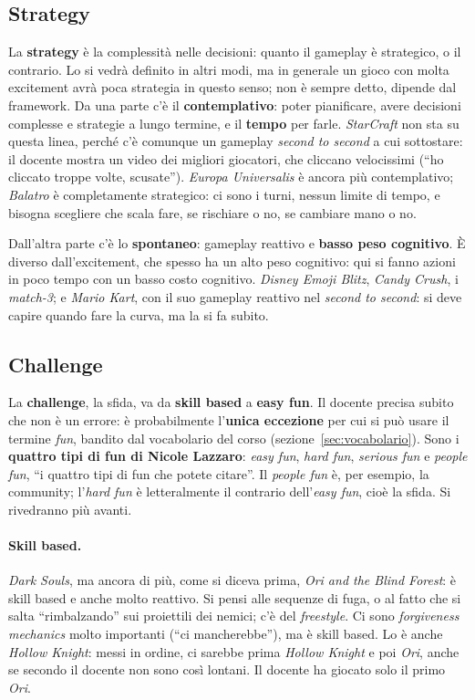 \subsection{Strategy}

La \textbf{strategy} è la complessità nelle decisioni: quanto il gameplay è
strategico, o il contrario. Lo si vedrà definito in altri modi, ma in
generale un gioco con molta excitement avrà poca strategia in questo senso;
non è sempre detto, dipende dal framework. Da una parte c'è il
\textbf{contemplativo}: poter pianificare, avere decisioni complesse e
strategie a lungo termine, e il \textbf{tempo} per farle. \emph{StarCraft}
non sta su questa linea, perché c'è comunque un gameplay \emph{second to
second} a cui sottostare: il docente mostra un video dei migliori giocatori,
che cliccano velocissimi (``ho cliccato troppe volte, scusate'').
\emph{Europa Universalis} è ancora più contemplativo; \emph{Balatro} è
completamente strategico: ci sono i turni, nessun limite di tempo, e bisogna
scegliere che scala fare, se rischiare o no, se cambiare mano o no.

Dall'altra parte c'è lo \textbf{spontaneo}: gameplay reattivo e \textbf{basso
peso cognitivo}. È diverso dall'excitement, che spesso ha un alto peso
cognitivo: qui si fanno azioni in poco tempo con un basso costo cognitivo.
\emph{Disney Emoji Blitz}, \emph{Candy Crush}, i \emph{match-3}; e \emph{Mario
Kart}, con il suo gameplay reattivo nel \emph{second to second}: si deve
capire quando fare la curva, ma la si fa subito.

\subsection{Challenge}

La \textbf{challenge}, la sfida, va da \textbf{skill based} a \textbf{easy
fun}. Il docente precisa subito che non è un errore: è probabilmente
l'\textbf{unica eccezione} per cui si può usare il termine \emph{fun}, bandito
dal vocabolario del corso (sezione~\ref{sec:vocabolario}). Sono i
\textbf{quattro tipi di fun di Nicole Lazzaro}: \emph{easy fun}, \emph{hard
fun}, \emph{serious fun} e \emph{people fun}, ``i quattro tipi di fun che
potete citare''. Il \emph{people fun} è, per esempio, la community; l'\emph{hard
fun} è letteralmente il contrario dell'\emph{easy fun}, cioè la sfida. Si
rivedranno più avanti.

\paragraph{Skill based.} \emph{Dark Souls}, ma ancora di più, come si diceva
prima, \emph{Ori and the Blind Forest}: è skill based e anche molto
reattivo. Si pensi alle sequenze di fuga, o al fatto che si salta
``rimbalzando'' sui proiettili dei nemici; c'è del \emph{freestyle}. Ci sono
\emph{forgiveness mechanics} molto importanti (``ci mancherebbe''), ma è skill
based. Lo è anche \emph{Hollow Knight}: messi in ordine, ci sarebbe prima
\emph{Hollow Knight} e poi \emph{Ori}, anche se secondo il docente non sono
così lontani. Il docente ha giocato solo il primo \emph{Ori}.

